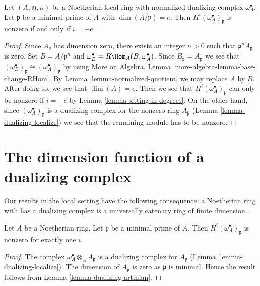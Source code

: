\begin{lemma}
\label{lemma-nonvanishing-generically-local}
Let $(A, \mathfrak m, \kappa)$ be a Noetherian local ring with
normalized dualizing complex $\omega_A^\bullet$.
Let $\mathfrak p$ be a minimal prime of $A$ with
$\dim(A/\mathfrak p) = e$. Then
$H^i(\omega_A^\bullet)_\mathfrak p$ is nonzero
if and only if $i = -e$.
\end{lemma}

\begin{proof}
Since $A_\mathfrak p$ has dimension zero, there exists an integer
$n > 0$ such that $\mathfrak p^nA_\mathfrak p$ is zero.
Set $B = A/\mathfrak p^n$ and
$\omega_B^\bullet = R\Hom_A(B, \omega_A^\bullet)$.
Since $B_\mathfrak p = A_\mathfrak p$ we see that
$(\omega_B^\bullet)_\mathfrak p \cong (\omega_A^\bullet)_\mathfrak p$
by using More on Algebra, Lemma \ref{more-algebra-lemma-base-change-RHom}.
By Lemma \ref{lemma-normalized-quotient} we may replace $A$ by $B$.
After doing so, we see that $\dim(A) = e$. Then we see that
$H^i(\omega_A^\bullet)_\mathfrak p$ can only be nonzero if $i = -e$
by Lemma \ref{lemma-sitting-in-degrees}.
On the other hand, since $(\omega_A^\bullet)_\mathfrak p$
is a dualizing complex for the nonzero ring $A_\mathfrak p$
(Lemma \ref{lemma-dualizing-localize})
we see that the remaining module has to be nonzero.
\end{proof}





\section{The dimension function of a dualizing complex}
\label{section-dimension-function}

\noindent
Our results in the local setting have the following consequence:
a Noetherian ring with has a dualizing complex is a
universally catenary ring of finite dimension.

\begin{lemma}
\label{lemma-nonvanishing-generically}
Let $A$ be a Noetherian ring. Let $\mathfrak p$ be a minimal prime
of $A$. Then $H^i(\omega_A^\bullet)_\mathfrak p$ is nonzero
for exactly one $i$.
\end{lemma}

\begin{proof}
The complex $\omega_A^\bullet \otimes_A A_\mathfrak p$
is a dualizing complex for $A_\mathfrak p$
(Lemma \ref{lemma-dualizing-localize}).
The dimension of $A_\mathfrak p$ is zero as $\mathfrak p$
is minimal. Hence the result follows from
Lemma \ref{lemma-dualizing-artinian}.
\end{proof}

